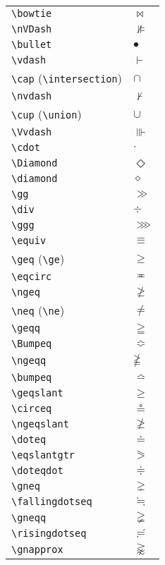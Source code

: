 \documentclass[text,xhtml,itex]{internet}
\begin{document}
\begin{tabular}{ll}
\verb+\bowtie+ & \(\bowtie\)          \\
\verb+\nVDash+ & \(\nVDash\) \\
\verb+\bullet+ & \(\bullet\) \\
\verb+\vdash+ & \(\vdash\) \\
\verb+\cap+ (\verb+\intersection+) & \(\cap\) \\
\verb+\nvdash+ & \(\nvdash\) \\
\verb+\cup+ (\verb+\union+) & \(\cup\)             \\
\verb+\Vvdash+ & \(\Vvdash\) \\
\verb+\cdot+ & \(\cdot\) \\
\verb+\Diamond+ & \(\Diamond\) \\
\verb+\diamond+               & \(\diamond\) \\
\verb+\gg+ & \(\gg\) \\
\verb+\div+                   & \(\div\) \\
\verb+\ggg+ & \(\ggg\) \\
\verb+\equiv+                 & \(\equiv\) \\
\verb+\geq+ (\verb+\ge+) & \(\geq\) \\
\verb+\eqcirc+                & \(\eqcirc\) \\
\verb+\ngeq+ & \(\ngeq\) \\
\verb+\neq+ (\verb+\ne+) & \(\neq\) \\
\verb+\geqq+ & \(\geqq\) \\
\verb+\Bumpeq+ & \(\Bumpeq\)          \\
\verb+\ngeqq+ & \(\ngeqq\) \\
\verb+\bumpeq+ & \(\bumpeq\) \\
\verb+\geqslant+ & \(\geqslant\) \\
\verb+\circeq+ & \(\circeq\)          \\
\verb+\ngeqslant+ & \(\ngeqslant\) \\
\verb+\doteq+ & \(\doteq\) \\
\verb+\eqslantgtr+ & \(\eqslantgtr\) \\
\verb+\doteqdot+ & \(\doteqdot\)        \\
\verb+\gneq+ & \(\gneq\) \\
\verb+\fallingdotseq+ & \(\fallingdotseq\) \\
\verb+\gneqq+ & \(\gneqq\) \\
\verb+\risingdotseq+ & \(\risingdotseq\)    \\
\verb+\gnapprox+ & \(\gnapprox\) \\

\end{tabular}
\end{document}

